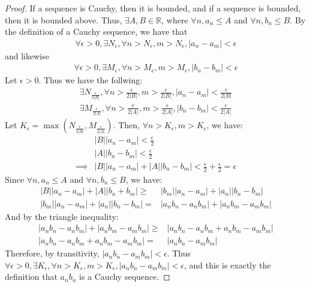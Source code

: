 \documentclass{article}
\newcommand{\reals}{\ensuremath{\mathbb{R}}}
\newcommand{\eps}{\ensuremath{\epsilon}}
\begin{document}
\begin{proof}
	If a sequence is Cauchy, then it is bounded,
	and if a sequence is bounded,
	then it is bounded above.
	Thus, $\exists A, B \in \reals$,
	where $\forall n, a_n \le A$
	and $\forall n, b_n \le B$.
	By the definition of a Cauchy sequence,
	we have that
	\begin{align}
		\forall \eps > 0, \exists N_\eps, \forall n > N_\eps, m > N_\eps, |a_n - a_m | < \eps
	\end{align}
	and likewise
	\begin{align}
		\forall \eps > 0, \exists M_\eps, \forall n > M_\eps, m > M_\eps, |b_n - b_m | < \eps
	\end{align}
	Let $\eps > 0$.
	Thus we have the follwing:
	\begin{align}
	\exists N_{\frac{\eps}{2|B|}}, \forall n >  \frac{\eps}{2|B|}, m > \frac{\eps}{2|B|},
	|a_n - a_m| < \frac{\eps}{2|B|} \\
	\exists M_{\frac{\eps}{2|A|}}, \forall n >  \frac{\eps}{2|A|}, m > \frac{\eps}{2|A|},
	|b_n - b_m| < \frac{\eps}{2|A|}
	\end{align}
	Let $K_\eps = \max(N_{\frac{\eps}{2|B|}}, M_{\frac{\eps}{2|A|}})$.
	Then, $\forall n > K_\eps, m > K_\eps$, we have:
	\begin{align}
			& |B||a_n - a_m| < \frac{\eps}{2} \\
			& |A||b_n - b_m| < \frac{\eps}{2} \\
		\implies & |B||a_n - a_m| + |A||b_n - b_m| < \frac{\eps}{2} + \frac{\eps}{2} = \eps
	\end{align}
	Since $\forall n, a_n \le A$ and $\forall n, b_n \le B$,
	we have:
	\begin{align}
		|B||a_n - a_m| + |A||b_n + b_m| \geq & |b_m||a_n - a_m| + |a_n||b_n - b_m| \\
		|b_m||a_n - a_m| + |a_n||b_n - b_m| = & |a_n b_n - a_n b_m| + |a_n b_m - a_m b_m|
	\end{align}
	And by the triangle inequality:
	\begin{align}
		|a_n b_n - a_n b_m| + |a_n b_m - a_m b_m| \geq & |a_n b_n - a_n b_m + a_n b_m - a_m b_m| \\
		|a_n b_n - a_n b_m + a_n b_m - a_m b_m| = & |a_n b_n - a_m b_m|
	\end{align}
	Therefore, by transitivity, $|a_n b_n - a_m b_m| < \eps$.
	Thus $\forall \eps > 0, \exists K_\eps, \forall n > K_\eps, m > K_\eps, |a_n b_n - a_m b_m| < \eps$,
	and this is exactly the definition that $a_n b_n$ is a Cauchy sequence.
\end{proof}
\end{document}
